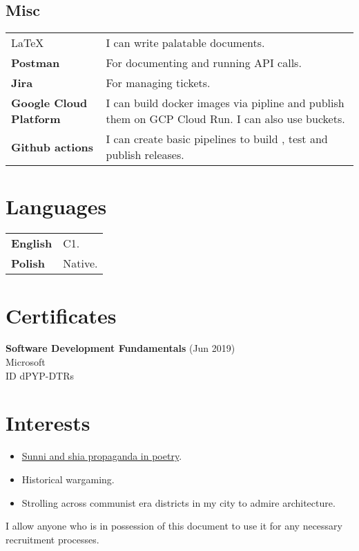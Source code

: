 \documentclass[10pt]{article}
\begin{document}
\subsection{Misc}
\begin{table}[H]
        \begin{tabularx}{\textwidth}{@{}l X}
         \LaTeX & I can write palatable documents. \\
         \textbf{Postman} & For documenting and running API calls.  \\
         \textbf{Jira} & For managing tickets.  \\
          \textbf{Google Cloud Platform} & I can build docker images via pipline and publish them on GCP Cloud Run. I can also use buckets.  \\
           \textbf{Github actions} & I can create basic pipelines to build , test and publish releases.  \\
\end{tabularx}
\end{table}
\section{Languages}
\begin{table}[H]
        \begin{tabularx}{\textwidth}{@{}l X}
         \bfseries English & C1. \\
         \bfseries Polish & Native.  \\
\end{tabularx}
\end{table}
\section{Certificates}
\Large \textbf{Software Development Fundamentals} (Jun 2019) \vspace{0.3em}\\
\large Microsoft \vspace{0.5em} \\
\small ID dPYP-DTRs \\
\section{Interests}
\begin{itemize}
    \item \href{http://cejsh.icm.edu.pl/cejsh/element/bwmeta1.element.desklight-b5b6fec4-8161-42ac-9a31-c0e6c344f9fa}{Sunni and shia propaganda in poetry}.
    \item Historical wargaming.
    \item Strolling across communist era districts in my city to admire architecture.
\end{itemize}
\vfill
\begin{center}
I allow anyone who is in possession of this document to use it for any necessary recruitment processes.
\end{center}
\end{document}
